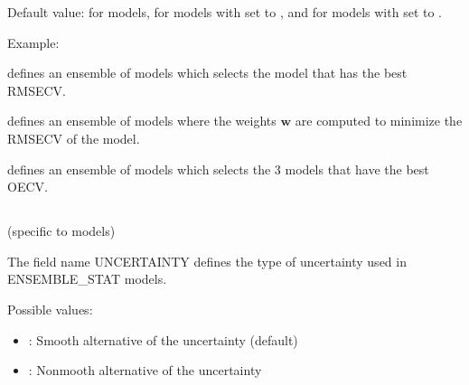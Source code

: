 \documentclass[letterpaper,10pt,english]{sphinxmanual}
\begin{document}
\begin{DUlineblock}{0em}
\item[] Default value:  for {\hyperref[\detokenize{SgteLib:ensemble}]{}} models,  for {\hyperref[\detokenize{SgteLib:ensemble-stat}]{}} models with {\hyperref[\detokenize{SgteLib:uncertainty}]{}} set to , and   for {\hyperref[\detokenize{SgteLib:ensemble-stat}]{}} models with {\hyperref[\detokenize{SgteLib:uncertainty}]{}} set to .
\end{DUlineblock}

\begin{DUlineblock}{0em}
\item[] Example:
\item[]  defines an ensemble of models which selects the model that has the best RMSECV.
\item[]  defines an ensemble of models where the weights \(\boldsymbol{w}\) are computed to minimize the RMSECV of the model.
\item[]  defines an ensemble of models which selects the 3 models that have the best OECV.
\end{DUlineblock}


\subsection{}
\label{\detokenize{SgteLib:uncertainty}}\label{\detokenize{SgteLib:id22}}
\sphinxAtStartPar
(specific to {\hyperref[\detokenize{SgteLib:ensemble-stat}]{}} models)

\begin{DUlineblock}{0em}
\item[] The field name UNCERTAINTY defines the type of uncertainty used in ENSEMBLE\_STAT models.
\item[] Possible values:
\end{DUlineblock}
\begin{itemize}
\item {} 
\sphinxAtStartPar
{}: Smooth alternative of the uncertainty (default)

\item {} 
\sphinxAtStartPar
{}: Nonmooth alternative of the uncertainty

\end{itemize}
\end{document}
